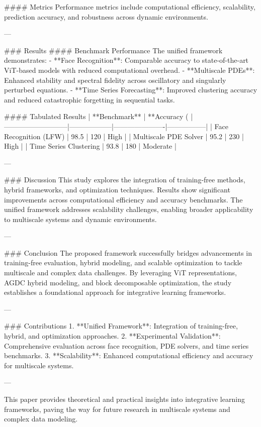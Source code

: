 #### Metrics  
Performance metrics include computational efficiency, scalability, prediction accuracy, and robustness across dynamic environments.

---

### Results  
#### Benchmark Performance  
The unified framework demonstrates:  
- **Face Recognition**: Comparable accuracy to state-of-the-art ViT-based models with reduced computational overhead.  
- **Multiscale PDEs**: Enhanced stability and spectral fidelity across oscillatory and singularly perturbed equations.  
- **Time Series Forecasting**: Improved clustering accuracy and reduced catastrophic forgetting in sequential tasks.  

#### Tabulated Results  
| **Benchmark**            | **Accuracy (%
|---------------------------|------------------|----------------------|-----------------|
| Face Recognition (LFW)   | 98.5             | 120                  | High            |
| Multiscale PDE Solver     | 95.2             | 230                  | High            |
| Time Series Clustering    | 93.8             | 180                  | Moderate        |

---

### Discussion  
This study explores the integration of training-free methods, hybrid frameworks, and optimization techniques. Results show significant improvements across computational efficiency and accuracy benchmarks. The unified framework addresses scalability challenges, enabling broader applicability to multiscale systems and dynamic environments.

---

### Conclusion  
The proposed framework successfully bridges advancements in training-free evaluation, hybrid modeling, and scalable optimization to tackle multiscale and complex data challenges. By leveraging ViT representations, AGDC hybrid modeling, and block decomposable optimization, the study establishes a foundational approach for integrative learning frameworks.

---

### Contributions  
1. **Unified Framework**: Integration of training-free, hybrid, and optimization approaches.  
2. **Experimental Validation**: Comprehensive evaluation across face recognition, PDE solvers, and time series benchmarks.  
3. **Scalability**: Enhanced computational efficiency and accuracy for multiscale systems.  

---  

This paper provides theoretical and practical insights into integrative learning frameworks, paving the way for future research in multiscale systems and complex data modeling.